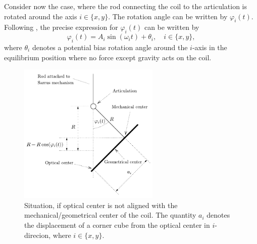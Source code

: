 \documentclass{report}
\numberwithin{tm}{section}
\begin{document}
Consider now the case, where the rod connecting the coil to the articulation is rotated around the axis $i \in \{x,y\}$. The rotation angle can be written by $\varphi_i(t)$. Following \cite[p.8]{Glardon.2024}, the precise expression for $\varphi_i(t)$ can be written by \begin{equation}
	\varphi_i(t) = A_i\sin(\omega_i t) +  \theta_i,  \quad i \in \{x,y\},
\end{equation} where $\theta_i$ denotes a potential bias rotation angle around the $i$-axis in the equilibrium position where no force except gravity acts on the coil.
\begin{figure}[h]
	\centering
	\includegraphics[width=0.6\textwidth]{figures/situation.pdf}
	\caption{Situation, if optical center is not aligned with the mechanical/geometrical center of the coil. The quantity $a_i$ denotes the displacement of a corner cube from the optical center in $i$-direcion, where $i  \in \{x,y\}$.}
	\label{fig:situation}
\end{figure}
\end{document}
